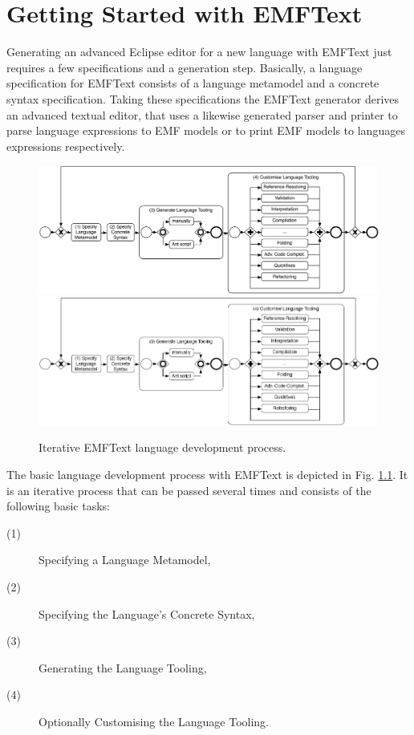 \chapter{Getting Started with EMFText}

	Generating an advanced Eclipse editor for a new language with EMFText just
	requires a few specifications and a generation step. 
	Basically, a language specification for EMFText consists of a language
	metamodel and a concrete syntax specification. Taking these specifications the
	EMFText generator derives an advanced textual editor, that uses a likewise
	generated parser and printer to parse language expressions to EMF models or to print EMF models to
	languages expressions respectively. 
	
	\begin{figure}[ht]
	\centering
	\ifpdf
		\includegraphics[scale=0.5]{figures/process.pdf}
	\else
		\includegraphics{figures/process.png}
	\fi
	\caption{Iterative EMFText language development process.}
	\label{fig:process}
	\end{figure}
	
	\noindent The basic language development process with EMFText is depicted in
	Fig. \ref{fig:process}. It is an iterative process that can be passed several
	times and consists of the following basic tasks:
	\begin{description}
	  \item[(1)] Specifying a Language Metamodel,
	  \item[(2)] Specifying the Language's Concrete Syntax,
	  \item[(3)] Generating the Language Tooling,
	  \item[(4)] Optionally Customising the Language Tooling.
	\end{description}
	
